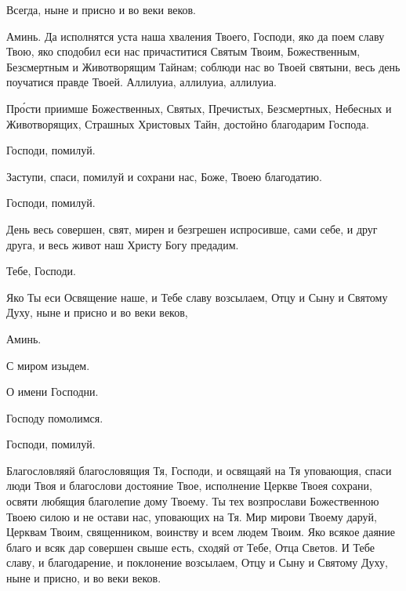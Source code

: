 \begin{mymulticols}
 Всегда, ныне и присно и во веки веков.

 Аминь. Да исполнятся уста наша хваления Твоего, Господи, яко да поем славу Твою, яко сподобил еси нас причаститися Святым Твоим, Божественным, Безсмертным и Животворящим Тайнам; соблюди нас во Твоей святыни, весь день поучатися правде Твоей. Аллилуиа, аллилуиа, аллилуиа. 



 Пр\'{о}сти приимше Божественных, Святых, Пречистых, Безсмертных, Небесных и Животворящих, Страшных Христовых Тайн, достойно благодарим Господа. 

 Господи, помилуй. 

 Заступи, спаси, помилуй и сохрани нас, Боже, Твоею благодатию. 

 Господи, помилуй. 

 День весь совершен, свят, мирен и безгрешен испросивше, сами себе, и друг друга, и весь живот наш Христу Богу предадим. 

 Тебе, Господи. 

 Яко Ты еси Освящение наше, и Тебе славу возсылаем, Отцу и Сыну и Святому Духу, ныне и присно и во веки веков,

 Аминь.

 С миром изыдем.

 О имени Господни. 

 Господу помолимся.

 Господи, помилуй. 


 Благословляяй благословящия Тя, Господи, и освящаяй на Тя уповающия, спаси люди Твоя и благослови достояние Твое, исполнение Церкве Твоея сохрани, освяти любящия благолепие дому Твоему. Ты тех возпрослави Божественною Твоею силою и не остави нас, уповающих на Тя. Мир мирови Твоему даруй, Церквам Твоим, священником, воинству и всем людем Твоим. Яко всякое даяние благо и всяк дар совершен свыше есть, сходяй от Тебе, Отца Светов. И Тебе славу, и благодарение, и поклонение возсылаем, Отцу и Сыну и Святому Духу, ныне и присно, и во веки веков. 


\end{mymulticols}
